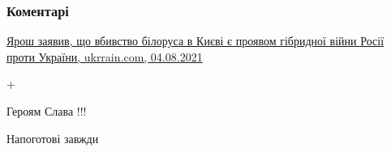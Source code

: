  
 
 
 
 
\subsubsection{Коментарі}
\label{sec:03_08_2021.fb.jarosh_dmitrij.1.a_la_guerre.cmt}

\begin{itemize}

\href{https://ukrrain.com/yarosh_zayaviv-_shho_vbivstvo_bilorusa_v_kievi_e_proyavom_gibridnoi_vijni_rosii_proti_ukraini.html}{%
Ярош заявив, що вбивство білоруса в Києві є проявом гібридної війни Росії проти України, ukrrain.com, 04.08.2021%
}

 
+

 
Героям Слава !!!

 
Напоготові завжди🤝🤝💪💪

 

\end{itemize}
